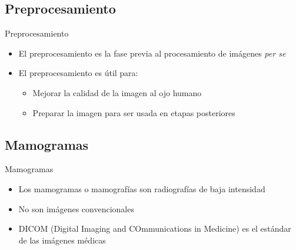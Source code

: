 \documentclass{beamer}
\begin{document}
\subsection{Preprocesamiento}
\begin{frame}{Preprocesamiento}
\transdissolve
   \pause
   \begin{itemize}
        \item<2-> 
                         {\color{red!30}El preprocesamiento es la fase previa al procesamiento de imágenes \textit{per se}}
        \item<2-> 
                         {\color{red!30}El preprocesamiento es útil para:}
                         \begin{itemize}
                            \item<2-> 
                                             {\color{red!30}Mejorar la calidad de la imagen al ojo humano}
                            \item<2-> 
                                             {\color{red!30}Preparar la imagen para ser usada en etapas posteriores}
                         \end{itemize}
   \end{itemize}
\end{frame}

\subsection{Mamogramas}
\begin{frame}{Mamogramas}
\transdissolve
   \pause
   \begin{itemize}
        \item<2-> 
                         {\color{red!30}Los mamogramas o mamografías son radiografías de baja intensidad}
        \item<2-> 
                         {\color{red!30}No son imágenes convencionales}
        \item<2-> 
                         {\color{red!30}DICOM (Digital Imaging and COmmunications in Medicine) es el estándar de las imágenes médicas}
   \end{itemize}
\end{frame}
\end{document}
